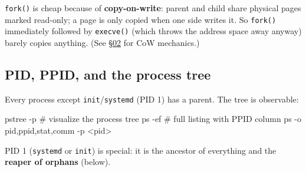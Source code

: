 \documentclass[11pt]{article}
\newenvironment{Shaded}{\begin{snugshade}}{\end{snugshade}}
\newcommand{\AttributeTok}[1]{\textcolor[rgb]{0.16,0.50,0.73}{#1}}
\newcommand{\CommentTok}[1]{\textcolor[rgb]{0.48,0.49,0.49}{#1}}
\newcommand{\ControlFlowTok}[1]{\textcolor[rgb]{0.99,0.74,0.29}{\textbf{#1}}}
\newcommand{\DecValTok}[1]{\textcolor[rgb]{0.96,0.45,0.00}{#1}}
\newcommand{\FunctionTok}[1]{\textcolor[rgb]{0.56,0.27,0.68}{#1}}
\newcommand{\NormalTok}[1]{\textcolor[rgb]{0.81,0.81,0.76}{#1}}
\newcommand{\OperatorTok}[1]{\textcolor[rgb]{0.81,0.81,0.76}{#1}}
\newcommand{\StringTok}[1]{\textcolor[rgb]{0.96,0.31,0.31}{#1}}
\begin{document}
\begin{Shaded}
\end{Shaded}

\texttt{fork()} is cheap because of \textbf{copy-on-write}: parent and child share physical pages marked read-only; a page is only copied when one side writes it. So \texttt{fork()} immediately followed by \texttt{execve()} (which throws the address space away anyway) barely copies anything. (See \hyperlink{section.02}{\textcolor{acc}{§02}} for CoW mechanics.)

\subsection{PID, PPID, and the process tree}\label{pid-ppid-and-the-process-tree}

Every process except \texttt{init}/\texttt{systemd} (PID 1) has a parent. The tree is observable:


\begin{Shaded}
\begin{Highlighting}[]
\FunctionTok{pstree} \AttributeTok{{-}p}              \CommentTok{\# visualize the process tree}
\FunctionTok{ps} \AttributeTok{{-}ef}                 \CommentTok{\# full listing with PPID column}
\FunctionTok{ps} \AttributeTok{{-}o}\NormalTok{ pid,ppid,stat,comm }\AttributeTok{{-}p} \OperatorTok{\textless{}}\NormalTok{pid}\OperatorTok{\textgreater{}}
\end{Highlighting}
\end{Shaded}

PID 1 (\texttt{systemd} or \texttt{init}) is special: it is the ancestor of everything and the \textbf{reaper of orphans} (below).
\end{document}
